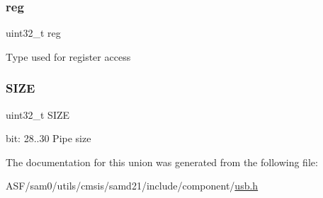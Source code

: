 \subsubsection{\texorpdfstring{reg}{reg}}
{\footnotesize\ttfamily uint32\+\_\+t reg}

Type used for register access \mbox{\label{union_u_s_b___h_o_s_t___p_c_k_s_i_z_e___type_a8aff32858d38b4e185cc0bfcb3926c04}} 
\subsubsection{\texorpdfstring{SIZE}{SIZE}}
{\footnotesize\ttfamily uint32\+\_\+t S\+I\+ZE}

bit\+: 28..30 Pipe size 

The documentation for this union was generated from the following file\+:\begin{DoxyCompactItemize}
\item 
A\+S\+F/sam0/utils/cmsis/samd21/include/component/\mbox{\hyperlink{component_2usb_8h}{usb.\+h}}\end{DoxyCompactItemize}
